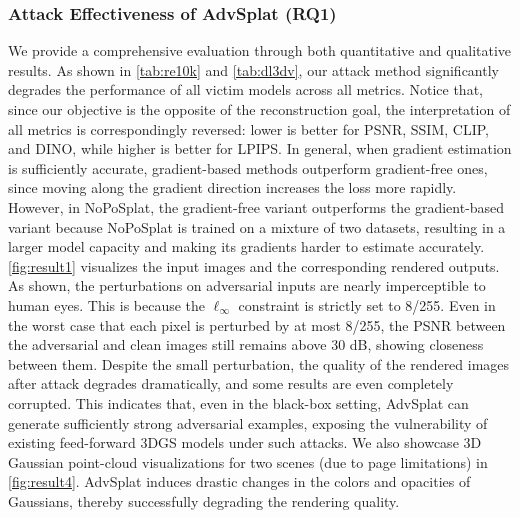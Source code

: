 \documentclass[runningheads]{llncs}
\begin{document}
\subsubsection{Attack Effectiveness of AdvSplat (RQ1)}
We provide a comprehensive evaluation through both quantitative and qualitative results. As shown in \cref{tab:re10k} and \cref{tab:dl3dv}, our attack method significantly degrades the performance of all victim models across all metrics. Notice that, since our objective is the opposite of the reconstruction goal, the interpretation of all metrics is correspondingly reversed: lower is better for PSNR, SSIM, CLIP, and DINO, while higher is better for LPIPS. In general, when gradient estimation is sufficiently accurate, gradient-based methods outperform gradient-free ones, since moving along the gradient direction increases the loss more rapidly. However, in NoPoSplat, the gradient-free variant outperforms the gradient-based variant because NoPoSplat is trained on a mixture of two datasets, resulting in a larger model capacity and making its gradients harder to estimate accurately. \cref{fig:result1} visualizes the input images and the corresponding rendered outputs. As shown, the perturbations on adversarial inputs are nearly imperceptible to human eyes. This is because the $\ell_\infty$ constraint is strictly set to 8/255. Even in the worst case that each pixel is perturbed by at most 8/255, the PSNR between the adversarial and clean images still remains above 30 dB, showing closeness between them. Despite the small perturbation, the quality of the rendered images after attack degrades dramatically, and some results are even completely corrupted. This indicates that, even in the black-box setting, AdvSplat can generate sufficiently strong adversarial examples, exposing the vulnerability of existing feed-forward 3DGS models under such attacks. We also showcase 3D Gaussian point-cloud visualizations for two scenes (due to page limitations) in \cref{fig:result4}. AdvSplat induces drastic changes in the colors and opacities of Gaussians, thereby successfully degrading the rendering quality.
\end{document}
